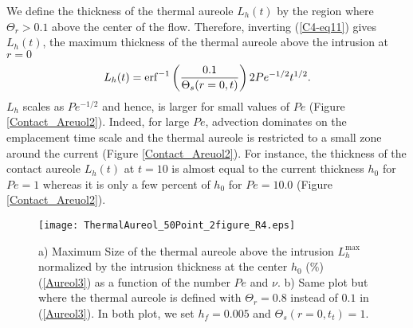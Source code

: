 We define the thickness of the  thermal aureole $L_h(t)$ by the region
where  $\Theta_r>0.1$  above  the  center  of  the  flow.   Therefore,
inverting (\ref{C4-eq11}) gives $L_h(t)$, the maximum thickness of the
thermal aureole above the intrusion at $r=0$
\begin{equation}
  L_h(t)                                                           =
  \operatorname{erf}^{-1}\left(\frac{0.1}{\Theta_s(r=0,t)}\right)2Pe^{-1/2}t^{1/2}.
  \label{Aureol}
\end{equation}
$L_h$ scales as  $Pe^{-1/2}$ and hence, is larger for  small values of
$Pe$ (Figure \ref{Contact_Areuol2}). Indeed, for large $Pe$, advection
dominates on  the emplacement  time scale and  the thermal  aureole is
restricted   to   a   small    zone   around   the   current   (Figure
\ref{Contact_Areuol2}).  For  instance, the  thickness of  the contact
aureole $L_h(t)$  at $t=10$ is  almost equal to the  current thickness
$h_0$  for $Pe=1$  whereas  it is  only  a few  percent  of $h_0$  for
$Pe=10.0$ (Figure \ref{Contact_Areuol2}).
\begin{figure}[h!]
  \begin{center}
    \graphicspath{ {/Users/thorey/Documents/These/Projet/Refroidissement/Skin_Model/Figure/Figure_Heating/} }
    \texttt{[image: ThermalAureol\_50Point\_2figure\_R4.eps]}
    \caption{a)  Maximum  Size  of   the  thermal  aureole  above  the
      intrusion   $L_h^{\text{max}}$  normalized   by  the   intrusion
      thickness  at  the  center  $h_0$ ($\%$)  (\ref{Aureol3})  as  a
      function of the  number $Pe$ and $\nu$.  b) Same  plot but where
      the thermal  aureole is  defined with $\Theta_r=0.8$  instead of
      $0.1$ in (\ref{Aureol3}).  In both  plot, we set $h_f=0.005$ and
      $\Theta_s(r=0,t_{t})=1$.}
    \label{PhaseHeatingContact}
  \end{center}
\end{figure}

